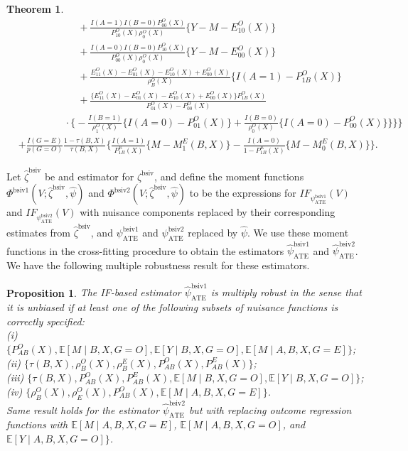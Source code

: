 \documentclass[10pt]{article}
\newtheorem{theorem}{Theorem}
\newtheorem{proposition}{Proposition}
\begin{document}
\begin{theorem}
\begin{align*}
    &~~~~~~~~~~~~~~~~~~~~~~~~~~~+\frac{I(A=1)I(B=0)P_{00}^O(X)}{P_{10}^O(X)\rho_0^O(X)}\{Y-M-E_{10}^O(X)\}\\
    &~~~~~~~~~~~~~~~~~~~~~~~~~~~+\frac{I(A=0)I(B=0)P_{10}^O(X)}{P_{00}^O(X)\rho_0^O(X)}\{Y-M-E_{00}^O(X)\}\\
    &~~~~~~~~~~~~~~~~~~~~~~~~~~~+\frac{E_{11}^O(X)-E_{01}^O(X)-E_{10}^O(X)+E_{00}^O(X)}{\rho_B^O(X)}\big\{I(A=1)-P_{1B}^O(X)\big\}\\
    &~~~~~~~~~~~~~~~~~~~~~~~~~~~ +\frac{\{E_{11}^O(X)-E_{01}^O(X)-E_{10}^O(X)+E_{00}^O(X)\}P_{1B}^O(X)}{P_{01}^O(X)-P_{00}^O(X)}\\
    &~~~~~~~~~~~~~~~~~~~~~\cdot\big\{-\frac{I(B=1)}{\rho_1^O(X)}\{I(A=0)-P_{01}^O(X)\}+\frac{I(B=0)}{\rho_0^O(X)}\{I(A=0)-P_{00}^O(X)\}\big\}\bigg\}\Bigg\}\\
    &+\frac{I(G=E)}{p(G=O)}\frac{1-\tau(B,X)}{\tau(B,X)}\bigg\{\frac{I(A=1)}{P_{1B}^E(X)}\{M-M_1^E(B,X)\}-\frac{I(A=0)}{1-P_{1B}^E(X)}\{M-M_0^E(B,X)\}\bigg\}
.
\end{align*}

\end{theorem}

Let $\hat\zeta^{\text{bsiv}}$ be and estimator for $\zeta^{\text{bsiv}}$, and define the moment functions $\Phi^{\text{bsiv1}}(V; \hat\zeta^{\text{bsiv}}, \hat\psi)$ and $\Phi^{\text{bsiv2}}(V; \hat\zeta^{\text{bsiv}}, \hat\psi)$ to be the expressions for $IF_{\psi^{\text{bsiv1}}_{\text{ATE}}}(V)$ and $IF_{\psi^{\text{bsiv2}}_{\text{ATE}}}(V)$ with nuisance components replaced by their corresponding estimates from $\hat\zeta^{\text{bsiv}}$, and $\psi^{\text{bsiv1}}_{\text{ATE}}$ and $\psi^{\text{bsiv2}}_{\text{ATE}}$ replaced by $\hat\psi$. We use these moment functions in the cross-fitting procedure to obtain the estimators $\hat\psi^{\text{bsiv1}}_{\text{ATE}}$ and $\hat\psi^{\text{bsiv2}}_{\text{ATE}}$. We have the following multiple robustness result for these estimators.

\begin{proposition}
\label{prop:DR:BSIV_ATE}
The IF-based estimator $\hat\psi^{\text{bsiv1}}_{\text{ATE}}$ is multiply robust in the sense that it is unbiased if at least one of the following subsets of nuisance functions is correctly specified:\\
(i) $\{P_{AB}^O(X),\mathbb{E}[M\mid B,X,G=O],\mathbb{E}[Y\mid B,X,G=O],\mathbb{E}[M\mid A,B,X,G=E]\}$;\\
(ii) $\{\tau(B,X),\rho_B^O(X),\rho_B^E(X),P_{AB}^O(X),P_{AB}^E(X)\}$;\\
(iii) $\{\tau(B,X),P_{AB}^O(X),P_{AB}^E(X),\mathbb{E}[M\mid B,X,G=O],\mathbb{E}[Y\mid B,X,G=O]\}$;\\
(iv) $\{\rho_B^O(X),\rho_E^O(X),P_{AB}^O(X),\mathbb{E}[M\mid A,B,X,G=E]\}$.\\
Same result holds for the estimator $\hat\psi^{\text{bsiv2}}_{\text{ATE}}$ 
but with replacing outcome regression functions with
$\mathbb{E}[M\mid A,B,X,G=E]$,
$\mathbb{E}[M\mid A,B,X,G=O]$, and
$\mathbb{E}[Y\mid A,B,X,G=O]\}$.
\end{proposition}
\end{document}
